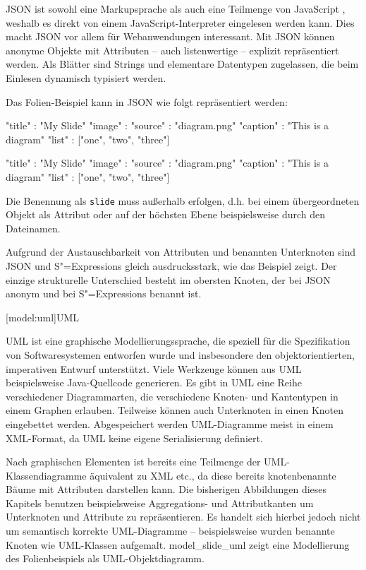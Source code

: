 \documentclass[11pt, a4paper, bibgerm]{scrbook}
\newenvironment{DIFnomarkup}{}{}
\newcommand\icode[1]{\lstinline?#1?}
\newcommand\lsection{}
\newcommand\abb{}
\newcommand{\sexps}{S"=Expressions}
\begin{document}
JSON ist sowohl eine Markupsprache als auch eine Teilmenge von
JavaScript \cite{JavaScript}, weshalb es direkt von einem
JavaScript-Interpreter eingelesen werden kann. Dies macht JSON vor allem
für Webanwendungen interessant. Mit JSON können anonyme Objekte mit
Attributen -- auch listenwertige -- explizit repräsentiert werden. Als
Blätter sind Strings und elementare Datentypen zugelassen, die beim
Einlesen dynamisch typisiert werden.

Das Folien-Beispiel kann in JSON wie folgt repräsentiert werden:
\begin{DIFnomarkup}\begin{code}
{
  "title" : "My Slide"
  "image" : {
    "source"  : "diagram.png"
    "caption" : "This is a diagram"
  }
  "list"  : ["one", "two", "three"]
}
\end{code}\end{DIFnomarkup}
\begin{DIFnomarkup}\begin{code}
{
  "title" : "My Slide"
  "image" : {
    "source"  : "diagram.png"
    "caption" : "This is a diagram"
  }
  "list"  : ["one", "two", "three"]
}
\end{code}\end{DIFnomarkup}
Die Benennung als \icode{slide} muss außerhalb erfolgen, d.h. bei einem
übergeordneten Objekt als Attribut oder auf der höchsten Ebene
beispielsweise durch den Dateinamen.

Aufgrund der Austauschbarkeit von Attributen und benannten Unterknoten
sind JSON und \sexps{} gleich ausdrucksstark, wie das Beispiel
zeigt. Der einzige strukturelle Unterschied besteht im obersten Knoten,
der bei JSON anonym und bei \sexps{} benannt ist.

\lsection[model:uml]{UML}

UML ist eine graphische Modellierungssprache, die speziell für die
Spezifikation von Softwaresystemen entworfen wurde und insbesondere den
objektorientierten, imperativen Entwurf unterstützt. Viele Werkzeuge können
aus UML beispielsweise Java-Quellcode generieren. Es gibt in UML eine
Reihe verschiedener Diagrammarten, die verschiedene Knoten- und
Kantentypen in einem Graphen erlauben. Teilweise können auch Unterknoten
in einen Knoten eingebettet werden. Abgespeichert werden UML-Diagramme
meist in einem XML-Format, da UML keine eigene Serialisierung definiert.

Nach graphischen Elementen ist bereits eine Teilmenge der
UML-Klassen\-diagramme äquivalent zu XML etc., da diese bereits
knotenbenannte Bäume mit Attributen darstellen kann. Die bisherigen
Abbildungen dieses Kapitels benutzen beispielsweise Aggregations- und
Attributkanten um Unterknoten und Attribute zu repräsentieren.  Es
handelt sich hierbei jedoch nicht um semantisch korrekte UML-Diagramme --
beispielsweise wurden benannte Knoten wie UML-Klassen
aufgemalt. \abb{model_slide_uml} zeigt eine Modellierung des
Folienbeispiels als UML-Objektdiagramm.
\end{document}
